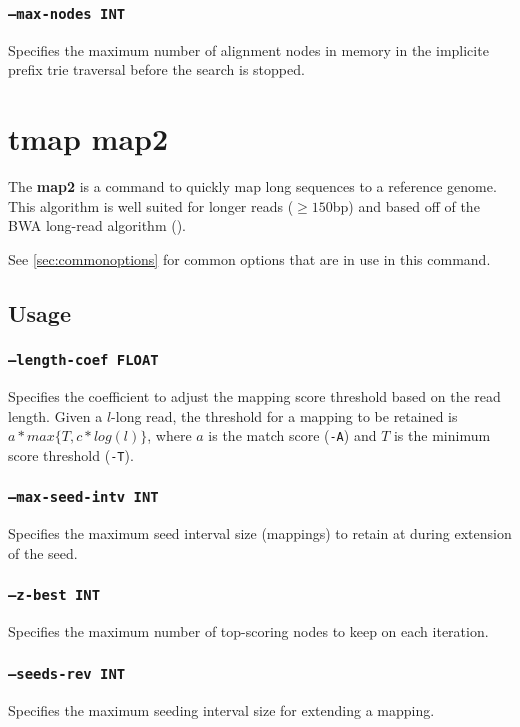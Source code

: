 \documentclass[a4paper,12pt]{book}
\newcommand{\TT}[1]{{\tt #1}} %
\newcommand{\BF}[1]{{\bf #1}} %
\begin{document}
\subsubsection{\TT{--max-nodes INT}}
Specifies the maximum number of alignment nodes in memory in the implicite prefix trie traversal before the search is stopped.

\section{tmap map2}
\label{sec:map2}
The \BF{map2} is a command to quickly map long sequences to a reference genome.
This algorithm is well suited for longer reads ($\geq 150$bp) and based off of the BWA long-read algorithm (\cite{BWA-long}).

See \autoref{sec:commonoptions} for common options that are in use in this command.

\subsection{Usage}

\subsubsection{\TT{--length-coef FLOAT}}
Specifies the coefficient to adjust the mapping score threshold based on the read length.
Given a $l$-long read, the threshold for a mapping to be retained is $a*max\{T,c*log(l)\}$, where $a$ is the match score (\TT{-A}) and $T$ is the minimum score threshold (\TT{-T}).

\subsubsection{\TT{--max-seed-intv INT}}
Specifies the maximum seed interval size (mappings) to retain at during extension of the seed.

\subsubsection{\TT{--z-best INT}}
Specifies the maximum number of top-scoring nodes to keep on each iteration.

\subsubsection{\TT{--seeds-rev INT}}
Specifies the maximum seeding interval size for extending a mapping.
\end{document}
